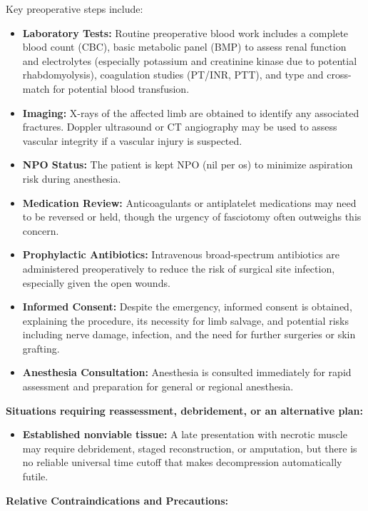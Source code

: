 Key preoperative steps include:

\begin{itemize}
  \item \textbf{Laboratory Tests:} Routine preoperative blood work includes a complete blood count (CBC), basic metabolic panel (BMP) to assess renal function and electrolytes (especially potassium and creatinine kinase due to potential rhabdomyolysis), coagulation studies (PT/INR, PTT), and type and cross-match for potential blood transfusion.
  \item \textbf{Imaging:} X-rays of the affected limb are obtained to identify any associated fractures. Doppler ultrasound or CT angiography may be used to assess vascular integrity if a vascular injury is suspected.
  \item \textbf{NPO Status:} The patient is kept NPO (nil per os) to minimize aspiration risk during anesthesia.
  \item \textbf{Medication Review:} Anticoagulants or antiplatelet medications may need to be reversed or held, though the urgency of fasciotomy often outweighs this concern.
  \item \textbf{Prophylactic Antibiotics:} Intravenous broad-spectrum antibiotics are administered preoperatively to reduce the risk of surgical site infection, especially given the open wounds.
  \item \textbf{Informed Consent:} Despite the emergency, informed consent is obtained, explaining the procedure, its necessity for limb salvage, and potential risks including nerve damage, infection, and the need for further surgeries or skin grafting.
  \item \textbf{Anesthesia Consultation:} Anesthesia is consulted immediately for rapid assessment and preparation for general or regional anesthesia.
\end{itemize}

\textbf{Situations requiring reassessment, debridement, or an alternative plan:}

\begin{itemize}
  \item \textbf{Established nonviable tissue:} A late presentation with necrotic muscle may require debridement, staged reconstruction, or amputation, but there is no reliable universal time cutoff that makes decompression automatically futile.
\end{itemize}

\textbf{Relative Contraindications and Precautions:}

